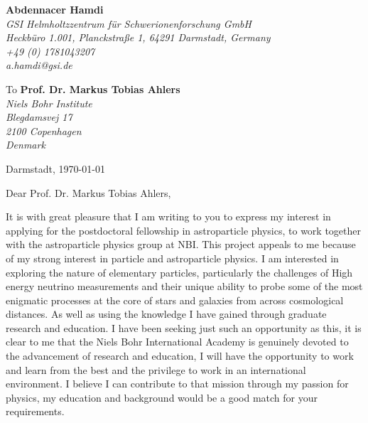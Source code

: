 \documentclass[11pt]{letter}
\begin{document}
 \sffamily
 \hfill
 \begin{flushleft}
 {\bfseries Abdennacer Hamdi}\\[.35ex]
 \small\itshape
 GSI Helmholtzzentrum f\"ur Schwerionenforschung GmbH\\
 Heckb\"uro 1.001, Planckstraße 1, 64291 Darmstadt, Germany\\[.35ex]
 +49 (0) 1781043207\\
 a.hamdi@gsi.de
 \end{flushleft}
 \begin{flushleft}
 To {\bfseries Prof. Dr. Markus Tobias Ahlers}\\[.35ex]
 \small\itshape
 Niels Bohr Institute \\
 Blegdamsvej 17 \\
 2100 Copenhagen \\
 Denmark

 \end{flushleft}
 \hfill
 \begin{flushleft}
 Darmstadt, \today \\
 
 \end{flushleft}
\par Dear Prof. Dr. Markus Tobias Ahlers,
~\par It is with great pleasure that I am writing to you to express my interest in applying for the postdoctoral fellowship in astroparticle physics, to work together with the astroparticle physics group at NBI. This project appeals to me because of my strong interest in particle and astroparticle physics. I am interested in exploring the nature of elementary particles, particularly the challenges of High energy neutrino measurements and their unique ability to probe some of the most enigmatic processes at the core of stars and galaxies from across cosmological distances. As well as using the knowledge I have gained through graduate research and education. I have been seeking just such an opportunity as this, it is clear to me that the Niels Bohr International Academy is genuinely devoted to the advancement of research and education, I will have the opportunity to work and learn from the best and the privilege to work in an international environment. I believe I can contribute to that mission through my passion for physics, my education and background would be a good match for your requirements.
\end{document}
